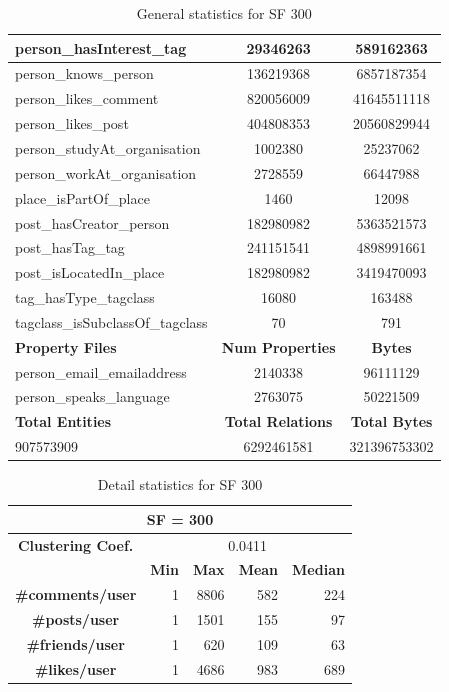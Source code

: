 \begin{table}[H]
\begin{tabular} {| l | c | c |}
        \hline
        person\_hasInterest\_tag & 29346263 & 589162363 \\
        \hline
        person\_knows\_person & 136219368 & 6857187354 \\
        \hline
        person\_likes\_comment & 820056009 & 41645511118 \\
        \hline
        person\_likes\_post & 404808353 & 20560829944 \\
        \hline
        person\_studyAt\_organisation & 1002380 & 25237062 \\
        \hline
        person\_workAt\_organisation & 2728559 & 66447988 \\
        \hline
        place\_isPartOf\_place & 1460 & 12098 \\
        \hline
        post\_hasCreator\_person & 182980982 & 5363521573 \\
        \hline
        post\_hasTag\_tag & 241151541 & 4898991661 \\
        \hline
        post\_isLocatedIn\_place & 182980982 & 3419470093 \\
        \hline
        tag\_hasType\_tagclass & 16080 & 163488 \\
        \hline
        tagclass\_isSubclassOf\_tagclass & 70 & 791 \\
        \hline
        \hline
        \textbf{Property Files} & \textbf{Num Properties} & \textbf{Bytes} \\
        \hline
        \hline
        person\_email\_emailaddress & 2140338 & 96111129 \\
        \hline
        person\_speaks\_language & 2763075 & 50221509 \\
        \hline
        \hline
        \textbf{Total Entities} & \textbf{Total Relations} & \textbf{Total Bytes} \\
        \hline
        \hline
         907573909 & 6292461581 & 321396753302 \\
        \hline
    \end{tabular}
    \caption{ General statistics for SF 300}
\end{table}

\begin{table}[H]
    \centering
\begin{tabular}{|c||r|r|r|r|}
\hline    \multicolumn{5}{|c|}{SF = 300 }  \\
\hline   \textbf{Clustering Coef.} &   \multicolumn{4}{|c|}{0.0411} \\
                            \hline & \textbf{Min} & \textbf{Max} & \textbf{Mean} & \textbf{Median}   \\
 \hline  \textbf{\#comments/user}  &1 &  8806 & 582 & 224 \\
    \hline  \textbf{\#posts/user}  &1 &  1501 & 155 & 97 \\
  \hline  \textbf{\#friends/user}  &1 &  620 & 109 & 63 \\
    \hline  \textbf{\#likes/user}  &1 &  4686 & 983 & 689 \\
\hline
\end{tabular}
\caption{Detail statistics for SF 300}
\end{table}

